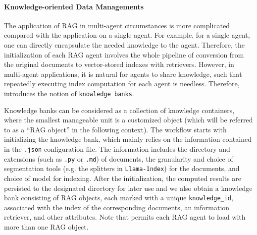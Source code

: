 
\paragraph{Knowledge-oriented Data Managements}
The application of RAG in multi-agent circumstances is more complicated compared with the application on a single agent. For example, for a single agent, one can directly encapsulate the needed knowledge to the agent. Therefore, the initialization of each RAG agent involves the whole pipeline of conversion from the original documents to vector-stored indexes with retrievers. However, in multi-agent applications, it is natural for agents to share knowledge, such that repeatedly executing index computation for each agent is needless. Therefore, \ours introduces the notion of \texttt{knowledge banks}.

Knowledge banks can be considered as a collection of knowledge containers, where the smallest manageable unit is a customized object (which will be referred to as a ``RAG object'' in the following context). The workflow starts with initializing the knowledge bank, which mainly relies on the information contained in the \texttt{.json} configuration file. The information includes the directory and extensions (such as \texttt{.py} or \texttt{.md}) of documents, the granularity and choice of segmentation tools (e.g. the splitters in \texttt{Llama-Index}) for the documents, and choice of model for indexing. After the initialization, the computed results are persisted to the designated directory for later use and we also obtain a knowledge bank consisting of RAG objects, each marked with a unique \texttt{knowledge\_id}, associated with the index of the corresponding documents, an information retriever, and other attributes. Note that \ours permits each RAG agent to load with more than one RAG object.

